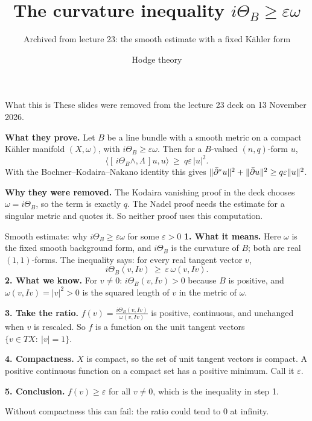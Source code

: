 
\title{The curvature inequality \(i\Theta_B\ge\varepsilon\omega\)}
\subtitle{Archived from lecture 23: the smooth estimate with a fixed K\"ahler form}
\date{Hodge theory}

\begin{frame}\titlepage\end{frame}

\begin{frame}{What this is}
These slides were removed from the lecture 23 deck on 13 November 2026.
\par\medskip
\textbf{What they prove.} Let \(B\) be a line bundle with a smooth metric on a compact K\"ahler manifold \((X,\omega)\), with \(i\Theta_B\ge\varepsilon\omega\). Then for a \(B\)-valued \((n,q)\)-form \(u\),
\[
\big\langle[\,i\Theta_B\wedge,\Lambda\,]u,u\big\rangle\ \ge\ q\varepsilon\,|u|^2 .
\]
With the Bochner--Kodaira--Nakano identity this gives \(\lVert\bar\partial^*u\rVert^2+\lVert\bar\partial u\rVert^2\ge q\varepsilon\lVert u\rVert^2\).
\par\medskip
\textbf{Why they were removed.} The Kodaira vanishing proof in the deck chooses \(\omega=i\Theta_B\), so the term is exactly \(q\). The Nadel proof needs the estimate for a singular metric and quotes it. So neither proof uses this computation.
\end{frame}

\begin{frame}{Smooth estimate: why \(i\Theta_B\ge\varepsilon\omega\) for some \(\varepsilon>0\)}
\label{fr:kv-proof-why-i-19}
\textbf{1. What it means.} Here \(\omega\) is the fixed smooth background form, and \(i\Theta_B\) is the curvature of \(B\); both are real \((1,1)\)-forms. The inequality says: for every real tangent vector \(v\),
\[
i\Theta_B(v,Iv)\ \ge\ \varepsilon\,\omega(v,Iv).
\]
\textbf{2. What we know.} For \(v\ne0\): \(i\Theta_B(v,Iv)>0\) because \(B\) is positive, and \(\omega(v,Iv)=|v|^2>0\) is the squared length of \(v\) in the metric of \(\omega\).
\par\medskip
\textbf{3. Take the ratio.}
\(\displaystyle f(v)=\frac{i\Theta_B(v,Iv)}{\omega(v,Iv)}\) is positive, continuous, and unchanged when \(v\) is rescaled.
So \(f\) is a function on the unit tangent vectors \(\{v\in TX:\ |v|=1\}\).
\par\medskip
\textbf{4. Compactness.} \(X\) is compact, so the set of unit tangent vectors is compact.
A positive continuous function on a compact set has a positive minimum. Call it \(\varepsilon\).
\par\medskip
\textbf{5. Conclusion.} \(f(v)\ge\varepsilon\) for all \(v\ne0\), which is the inequality in step 1.
\par\medskip
Without compactness this can fail: the ratio could tend to \(0\) at infinity.
\end{frame}

